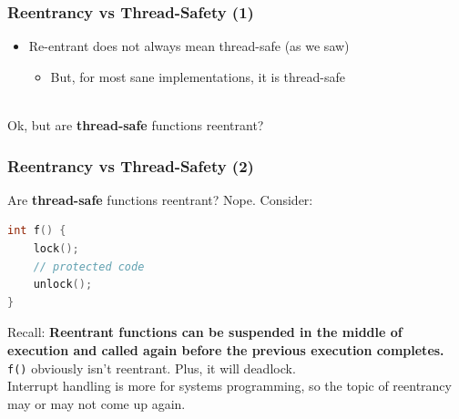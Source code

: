 \begin{frame}
  \frametitle{Reentrancy vs Thread-Safety (1)}

  
  \begin{itemize}
    \item Re-entrant does not always mean thread-safe (as we saw)
      \begin{itemize}
        \item But, for most sane implementations, it is thread-safe
      \end{itemize}
  \end{itemize}~\\[1em]

  Ok, but are {\bf thread-safe} functions reentrant?
  
\end{frame}

\begin{frame}[fragile]
  \frametitle{Reentrancy vs Thread-Safety (2)}

  
  Are {\bf thread-safe} functions reentrant? \alert{Nope.} Consider:

  \begin{lstlisting}[language=C]
int f() {
    lock();
    // protected code
    unlock();
}
  \end{lstlisting}

  Recall: {\bf Reentrant functions can be suspended in the middle of execution
    and called again before the previous execution completes.}\\[1em]

  {\tt f()} obviously isn't reentrant. Plus, it will deadlock.\\[1em]

  Interrupt handling is more for systems programming, so the topic of reentrancy may or may not come
  up again.
  
\end{frame}

